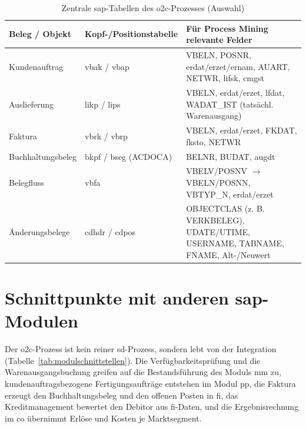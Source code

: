 \begin{table}[!htb]
\centering
\caption{Zentrale \gls{sap}-Tabellen des \gls{o2c}-Prozesses (Auswahl)}\label{tab:zentrale-sap-tabellen}
\small
\begin{tabularx}{\textwidth}{@{}>{\RaggedRight\arraybackslash}p{2.5cm} >{\RaggedRight\arraybackslash}p{4.4cm} Y@{}}
\toprule
\textbf{Beleg /\allowbreak{} Objekt} & \textbf{Kopf-/\allowbreak{}Positionstabelle} & \textbf{Für Process Mining relevante Felder} \\
\midrule
Kundenauftrag & \gls{vbak} /\allowbreak{} \gls{vbap} & VBELN, POSNR, \gls{erdat}/\allowbreak{}\gls{erzet}/\allowbreak{}\gls{ernam}, AUART, NETWR, \gls{lifsk}, \gls{cmgst} \\
Auslieferung & \gls{likp} /\allowbreak{} \gls{lips} & VBELN, \gls{erdat}/\allowbreak{}\gls{erzet}, \gls{lfdat}, WADAT\_IST (tatsächl. Warenausgang) \\
Faktura & \gls{vbrk} /\allowbreak{} \gls{vbrp} & VBELN, \gls{erdat}/\allowbreak{}\gls{erzet}, FKDAT, \gls{fksto}, NETWR \\
Buchhaltungsbeleg & \gls{bkpf} /\allowbreak{} \gls{bseg} (ACDOCA) & BELNR, BUDAT, \gls{augdt} \\
Belegfluss & \gls{vbfa} & VBELV/\allowbreak{}POSNV $\rightarrow$ VBELN/\allowbreak{}POSNN, VBTYP\_N, \gls{erdat}/\allowbreak{}\gls{erzet} \\
Änderungsbelege & \gls{cdhdr} /\allowbreak{} \gls{cdpos} & OBJECTCLAS (z. B. VERKBELEG), UDATE/\allowbreak{}UTIME, USERNAME, TABNAME, FNAME, Alt-/\allowbreak{}Neuwert \\
\bottomrule
\end{tabularx}
\end{table}

\section{Schnittpunkte mit anderen \gls{sap}-Modulen}\label{sec:modulschnittstellen}

Der \gls{o2c}-Prozess ist kein reiner \gls{sd}-Prozess, sondern lebt von der Integration (Tabelle~\ref{tab:modulschnittstellen}). Die Verfügbarkeitsprüfung und die Warenausgangsbuchung greifen auf die Bestandsführung des Moduls \gls{mm} zu, kundenauftragsbezogene Fertigungsaufträge entstehen im Modul \gls{pp}, die Faktura erzeugt den Buchhaltungsbeleg und den offenen Posten in \gls{fi}, das Kreditmanagement bewertet den Debitor aus \gls{fi}-Daten, und die Ergebnisrechnung im \gls{co} übernimmt Erlöse und Kosten je Marktsegment.

